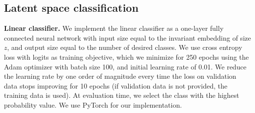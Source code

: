 \begin{table}[h!]
\begin{center}
\end{center}
\caption{{\bf Model architecture hyperparameters and training time for each H-AE trained on protein
neighborhoods.}}
\label{table:NBs_model_architectures}
\end{table}




\subsection{Latent space classification}
\label{sec:latent_space_classification}
\noindent \textbf{Linear classifier.}
We implement the linear classifier as a one-layer fully connected neural network with input size
equal to the invariant embedding of size $z$, and output size equal to the number of desired
classes. We use cross entropy loss with logits as training objective, which we minimize for 250
epochs using the Adam optimizer with batch size 100, and initial learning rate of 0.01. We reduce
the learning rate by one order of magnitude every time the loss on validation data stops improving
for 10 epochs (if validation data is not provided, the training data is used). At evaluation time,
we select the class with the highest probability value. We use PyTorch for our implementation.

